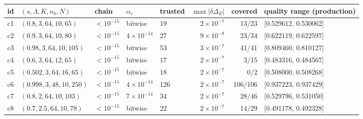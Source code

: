 \begin{tabular}{@{}lllllrrl@{}}
\toprule
id & $(s,\Lambda,K,n_b,N)$ & chain & $\alpha_c$ & trusted & $\max|\delta\Delta_E|$ & covered & quality range (production)\\
\midrule
c1 & $(0.8,3,64,10,65)$ & $<10^{-15}$ & bitwise & 19 & $2\times10^{-7}$ & 13/23 & [0.529612, 0.530062]\\
c2 & $(0.9,3,64,10,80)$ & $<10^{-15}$ & $4\times10^{-14}$ & 27 & $9\times10^{-8}$ & 23/34 & [0.622119, 0.622597]\\
c3 & $(0.98,3,64,10,105)$ & $<10^{-15}$ & bitwise & 53 & $3\times10^{-7}$ & 41/41 & [0.809460, 0.810127]\\
c4 & $(0.6,3,64,12,65)$ & $<10^{-15}$ & bitwise & 17 & $2\times10^{-7}$ & 3/15 & [0.483316, 0.484567]\\
c5 & $(0.502,3,64,16,65)$ & $<10^{-15}$ & bitwise & 18 & $2\times10^{-7}$ & 0/2 & [0.508000, 0.508268]\\
c6 & $(0.998,3,48,10,250)$ & $<10^{-15}$ & $4\times10^{-14}$ & 126 & $2\times10^{-7}$ & 106/106 & [0.937223, 0.937429]\\
c7 & $(0.8,2,64,10,103)$ & $<10^{-15}$ & $7\times10^{-14}$ & 34 & $2\times10^{-7}$ & 28/46 & [0.529796, 0.531050]\\
c8 & $(0.7,2.5,64,10,78)$ & $<10^{-15}$ & bitwise & 22 & $2\times10^{-7}$ & 14/29 & [0.491178, 0.492328]\\
\bottomrule
\end{tabular}
